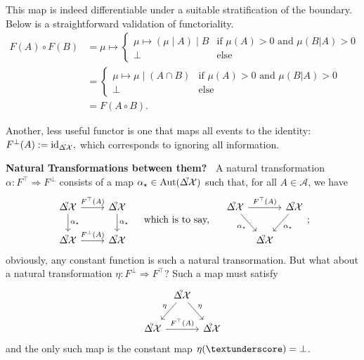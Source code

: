 \documentclass{article}
\DeclareMathOperator{\id}{id}
\begin{document}
    This map is indeed differentiable under a suitable stratification of the boundary. 
    Below is a straightforward validation of functoriality. 
    \begin{align*}
        F(A) \circ F(B) 
            &=  \mu \mapsto 
                \begin{cases}
                    \mu \mapsto (\mu \mid A) \mid B & \text{if $\mu(A) > 0$ and $\mu(B|A) > 0$} \\
                    \bot &\text{else}
                \end{cases} \\
            &= \begin{cases}
                    \mu \mapsto \mu \mid (A \cap B) & \text{if $\mu(A) > 0$ and $\mu(B|A) > 0$} \\
                    \bot &\text{else}
                \end{cases} \\
            &= F(A \circ B).
    \end{align*}
    
    Another, less useful functor is one that maps all events to the identity:
    $
        F^\bot(A) := \id_{\DX?},
    $ 
    which corresponds to ignoring all information. 
    
    \smallskip
    \begin{phaseout}
    \textbf{Natural Transformations between them?~}
    A natural transformation $\alpha : F^\top \Rightarrow F^{\bot}$ consists of a map $\alpha_\star \in \mathrm{Aut}(\DX?)$ such that, for all $A \in \mathcal A$, we have
    \[
        \begin{tikzcd}
            \DX? \ar[r,"F^\top(A)"] \ar[d,"\alpha_\star"]
                & \DX? \ar[d, "\alpha_\star"] \\
            \DX? \ar[r,"F^{\bot}(A)"] & \DX?
        \end{tikzcd}
        \quad
        \text{ which is to say, }
        \quad
        \begin{tikzcd}[column sep=4]
            \DX? \ar[rr,"F^\top(A)"] \ar[dr,"\alpha_\star"']
                && \DX? \ar[dl, "\alpha_\star"] \\
            & \DX?
        \end{tikzcd};
    \]
    obviously, any constant function is such a natural transormation. But what about a natural transformation $\eta : F^\bot \Rightarrow F^\top$? Such a map must satisfy
    \[
        \begin{tikzcd}[column sep=4]
            & \DX? \ar[dr,"\eta"]\ar[dl,"\eta"'] & \\
            \DX? \ar[rr,"F^\top(A)"] && \DX? 
        \end{tikzcd}
    \]
    and the only such map is the constant map $\eta(\textunderscore) = \bot$.
    \end{phaseout}
    \smallskip
    
\end{document}
